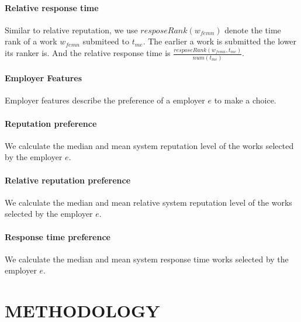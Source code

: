 \documentclass{article}
\begin{document}
\paragraph{Relative response time} Similar to relative reputation, we use $resposeRank({w}_{femn})$ denote the time rank of a work ${w}_{femn}$ submiteed to ${t}_{me}$. The earlier a work is submitted the lower its ranker is. And the relative response time is $\frac{resposeRank({w}_{femn}, {t}_{me})}{num({t}_{me})}$.
\paragraph{Employer Features} Employer features describe the preference of a employer $e$ to make a choice.
\paragraph{Reputation preference} We calculate the median and mean system reputation level of the works selected by the employer $e$.
\paragraph{Relative reputation preference}We calculate the median and mean relative system reputation level of the works selected by the employer $e$.
\paragraph{Response time preference}We calculate the median and mean system response time works selected by the employer $e$.

\section{METHODOLOGY}
\end{document}
